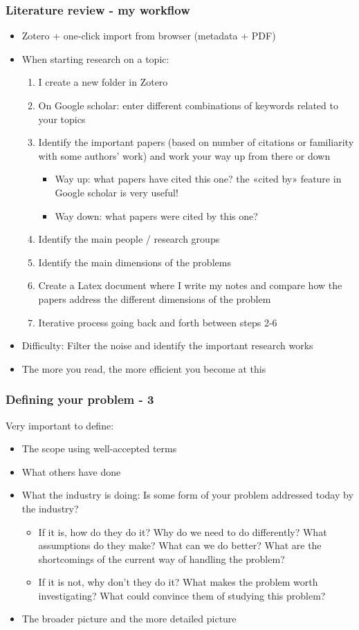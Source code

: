 \documentclass[screen, aspectratio=43]{beamer}
\begin{document}
\begin{frame}
  \frametitle{Literature review - my workflow}
  \begin{itemize}
  \item Zotero + one-click import from browser (metadata + PDF)
  \item When starting research on a topic:
    \begin{enumerate}
    \item I create a new folder in Zotero
    \item On Google scholar: enter different combinations of keywords related to your topics
    \item Identify the important papers (based on number of citations or familiarity with some authors’ work) and work your way up from there or down
      \begin{itemize}
      \item Way up: what papers have cited this one? the «cited by» feature in Google scholar is very useful!
      \item Way down: what papers were cited by this one? 
      \end{itemize}
    \item Identify the main people / research groups
    \item Identify the main dimensions of the problems
    \item Create a Latex document where I write my notes and compare how the papers address the different dimensions of the problem
    \item Iterative process going back and forth between steps 2-6
    \end{enumerate}
  \item Difficulty: Filter the noise and identify the important research works
  \item The more you read, the more efficient you become at this
  \end{itemize} 
\end{frame}

\begin{frame}
\frametitle{Defining your problem - 3}
Very important to define:
\begin{itemize}
\item The scope using well-accepted terms
\item What others have done
\item What the industry is doing: Is some form of your problem addressed today by the industry?
  \begin{itemize}
  \item If it is, how do they do it? Why do we need to do differently? What assumptions do they make? What can we do better? What are the shortcomings of the current way of handling the problem?
  \item If it is not, why don’t they do it? What makes the problem worth investigating? What could convince them of studying this problem?
  \end{itemize}
\item The broader picture and the more detailed picture
\end{itemize}    
\end{frame}
\end{document}
